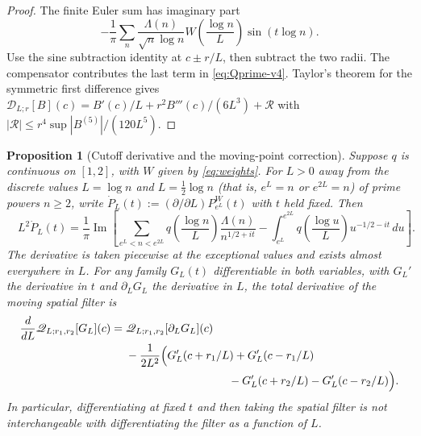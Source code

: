 \documentclass[11pt,a4paper]{article}
\numberwithin{equation}{section}
\newtheorem{proposition}[theorem]{Proposition}
\theoremstyle{definition}
\theoremstyle{remark}
\begin{document}
\begin{proof}
The finite Euler sum has imaginary part
\begin{equation}
-\frac1\pi\sum_n\frac{\Lambda(n)}{\sqrt n\log n}
 W\!\left(\frac{\log n}{L}\right)\sin(t\log n).
\end{equation}
Use the sine subtraction identity at $c\pm r/L$, then subtract
the two radii. The compensator contributes the last term in
\eqref{eq:Qprime-v4}. Taylor's theorem for the symmetric first
difference gives
$\mathscr D_{L;r}[B](c)=B'(c)/L+
 r^2B'''(c)/(6L^3)+\mathcal R$ with
$|\mathcal R|\le r^4\sup|B^{(5)}|/(120L^5)$.
\end{proof}

\begin{proposition}[Cutoff derivative and the moving-point correction]
\label{prop:dL-v4}
Suppose $q$ is continuous on $[1,2]$, with $W$ given by
\eqref{eq:weights}. For $L>0$ away from the discrete values
$L=\log n$ and $L=\tfrac12\log n$ (that is, $e^L=n$ or $e^{2L}=n$) of prime powers $n\ge2$,
write $\dot P_L(t):=(\partial/\partial L)
P_{e^L}^W(t)$ with $t$ \emph{held fixed}. Then
\begin{equation}\label{eq:dLprime-v4}
 \boxed{\quad
 L^2\dot P_L(t)=\frac1\pi\operatorname{Im}
 \left[\sum_{e^L<n<e^{2L}}
 q\!\left(\frac{\log n}{L}\right)
 \frac{\Lambda(n)}{n^{1/2+it}}
 -\int_{e^L}^{e^{2L}}
 q\!\left(\frac{\log u}{L}\right)u^{-1/2-it}\,du
 \right].\quad}
\end{equation}
The derivative is taken piecewise at the exceptional values and
exists almost everywhere in $L$. For any family $G_L(t)$
differentiable in both variables, with $G_L'$ the derivative in $t$ and
$\partial_LG_L$ the derivative in $L$, the \emph{total} derivative of the moving spatial filter is
\begin{equation}\label{eq:commutator-v4}
\begin{split}
\frac{d}{dL}\mathscr Q_{L;r_1,r_2}[G_L](c)
={}&\mathscr Q_{L;r_1,r_2}[\partial_LG_L](c)\\
&-\frac{1}{2L^2}\Bigl(G_L'(c+r_1/L)+G_L'(c-r_1/L)\\
&\hspace{32mm}-G_L'(c+r_2/L)-G_L'(c-r_2/L)\Bigr).
\end{split}
\end{equation}
In particular, differentiating at fixed $t$ and then taking the
spatial filter is \emph{not} interchangeable with differentiating
the filter as a function of $L$.
\end{proposition}
\end{document}
